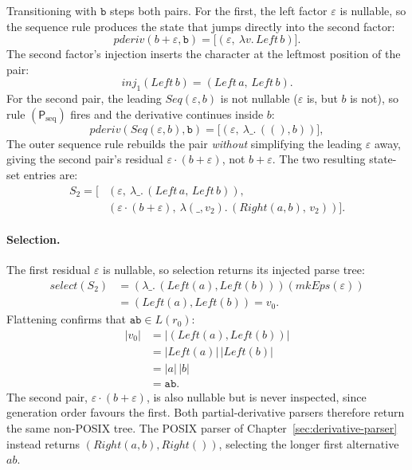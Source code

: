 Transitioning with $\mathtt{b}$ steps both pairs. 
For the first, the left factor $\varepsilon$ is nullable, 
so the sequence rule produces the state that jumps directly into the second factor:
\[
\mathit{pderiv}(b + \varepsilon, \mathtt{b})
  = \bigl[(\varepsilon,\ \lambda v.\, \mathit{Left}\,b)\bigr].
\]
The second factor's injection inserts the character at the leftmost position
of the pair:
\[
\mathit{inj}_1(\mathit{Left}\,b) = (\mathit{Left}\,a,\, \mathit{Left}\,b).
\]
For the second pair, 
the leading $\mathit{Seq}(\varepsilon, b)$ is not nullable 
($\varepsilon$ is, but $b$ is not), 
so rule $(\mathsf{P}_{\mathrm{seq}})$ fires 
and the derivative continues inside $b$:
\[
\mathit{pderiv}(\mathit{Seq}(\varepsilon, b), \mathtt{b})
  = \bigl[(\varepsilon,\ \lambda\_.\, ((), b))\bigr],
\]
The outer sequence rule rebuilds the pair 
\emph{without} simplifying the leading $\varepsilon$ away, 
giving the second pair's residual 
$\varepsilon \cdot (b + \varepsilon)$, not $b + \varepsilon$. 
The two resulting state-set entries are:
\[
\begin{aligned}
S_2
  = \bigl[
    &(\varepsilon,\ \lambda\_.\, (\mathit{Left}\,a,\, \mathit{Left}\,b)), \\
    &(\varepsilon \cdot (b + \varepsilon),\ \lambda(\_, v_2).\,
       (\mathit{Right}(a, b),\, v_2))\bigr].
\end{aligned}
\]

%

\paragraph{Selection.}
The first residual $\varepsilon$ is nullable, 
so selection returns its injected parse tree:
\[
\begin{aligned}
\mathit{select}(S_2)
  &= (\lambda\_.\,(\mathit{Left}(a),\mathit{Left}(b)))
     (\mathit{mkEps}(\varepsilon)) \\
  &= (\mathit{Left}(a),\mathit{Left}(b))
  = v_0.
\end{aligned}
\]
Flattening confirms that $\mathtt{ab} \in L(r_0)$:
\[
\begin{aligned}
|v_0|
  &= |(\mathit{Left}(a),\mathit{Left}(b))| \\
  &= |\mathit{Left}(a)|\,|\mathit{Left}(b)| \\
  &= |a|\,|b| \\
  &= \mathtt{ab}.
\end{aligned}
\]
The second pair, $\varepsilon\cdot(b+\varepsilon)$, is also
nullable but is never inspected, since generation order favours
the first. Both partial-derivative parsers therefore return
the same non-POSIX tree. The POSIX parser of
Chapter~\ref{sec:derivative-parser} instead returns
$(\mathit{Right}(a,b),\mathit{Right}())$, selecting the longer
first alternative $ab$.


